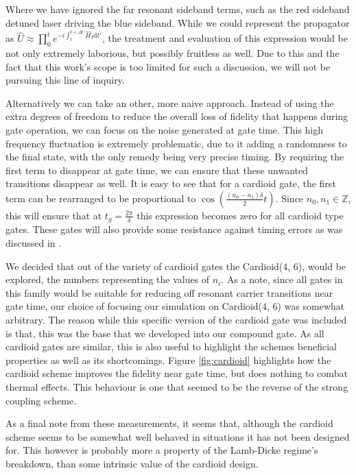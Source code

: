 \documentclass[12pt,twoside]{report}
\begin{document}
Where we have ignored the far resonant sideband terms, such as the red sideband detuned laser driving the blue sideband. While we could represent the propagator as $\hat{U}\approx \prod_0^t e^{-i\int_{t}^{t + \Delta t}\hat{H}_I\text{d}t'}$, the treatment and evaluation of this expression would be not only extremely laborious, but possibly fruitless as well. Due to this and the fact that this work's scope is too limited for such a discussion, we will not be pursuing this line of inquiry. 

Alternatively we can take an other, more naive approach. Instead of using the extra degrees of freedom to reduce the overall loss of fidelity that happens during gate operation, we can focus on the noise generated at gate time. This high frequency fluctuation is extremely problematic, due to it adding a randomness to the final state, with the only remedy being very precise timing. By requiring the first term to disappear at gate time, we can ensure that these unwanted transitions disappear as well. It is easy to see that for a cardioid gate, the first term can be rearranged to be proportional to $\cos(\frac{(n_0 - n_1)\delta}{2}t)$. Since $n_0, n_1 \in \mathbb{Z}$, this will ensure that at $t_g = \frac{2\pi}{\delta}$ this expression becomes zero for all cardioid type gates. These gates will also provide some resistance against timing errors as was discussed in \cite{Cardioid}.

We decided that out of the variety of cardioid gates the Cardioid($4$, $6$), would be explored, the numbers representing the values of $n_i$. As a note, since all gates in this family would be suitable for reducing off resonant carrier transitions near gate time, our choice of focusing our simulation on Cardioid($4$, $6$) was somewhat arbitrary. The reason while this specific version of the cardioid gate was included is that, this was the base that we developed into our compound gate. As all cardioid gates are similar, this is also useful to highlight the schemes beneficial properties as well as its shortcomings. Figure \ref{fig:cardioid} highlights how the cardioid scheme improves the fidelity near gate time, but does nothing to combat thermal effects. This behaviour is one that seemed to be the reverse of the strong coupling scheme.

As a final note from these measurements, it seems that, although the cardioid scheme seems to be somewhat well behaved in situations it has not been designed for. This however is probably more a property of the Lamb-Dicke regime's breakdown, than some intrinsic value of the cardioid design.
\end{document}

